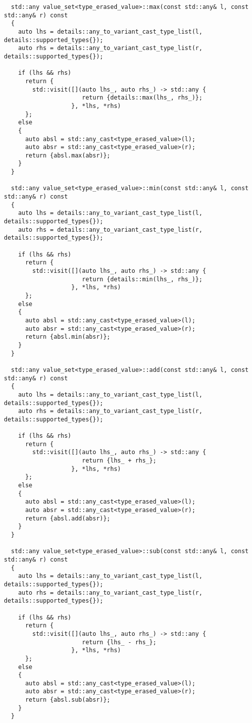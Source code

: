 \begin{verbatim}
  std::any value_set<type_erased_value>::max(const std::any& l, const std::any& r) const
  {
    auto lhs = details::any_to_variant_cast_type_list(l, details::supported_types{});
    auto rhs = details::any_to_variant_cast_type_list(r, details::supported_types{});

    if (lhs && rhs)
      return {
        std::visit([](auto lhs_, auto rhs_) -> std::any {
                      return {details::max(lhs_, rhs_)};
                   }, *lhs, *rhs)
      };
    else
    {
      auto absl = std::any_cast<type_erased_value>(l);
      auto absr = std::any_cast<type_erased_value>(r);
      return {absl.max(absr)};
    }
  }

  std::any value_set<type_erased_value>::min(const std::any& l, const std::any& r) const
  {
    auto lhs = details::any_to_variant_cast_type_list(l, details::supported_types{});
    auto rhs = details::any_to_variant_cast_type_list(r, details::supported_types{});

    if (lhs && rhs)
      return {
        std::visit([](auto lhs_, auto rhs_) -> std::any {
                      return {details::min(lhs_, rhs_)};
                   }, *lhs, *rhs)
      };
    else
    {
      auto absl = std::any_cast<type_erased_value>(l);
      auto absr = std::any_cast<type_erased_value>(r);
      return {absl.min(absr)};
    }
  }

  std::any value_set<type_erased_value>::add(const std::any& l, const std::any& r) const
  {
    auto lhs = details::any_to_variant_cast_type_list(l, details::supported_types{});
    auto rhs = details::any_to_variant_cast_type_list(r, details::supported_types{});

    if (lhs && rhs)
      return {
        std::visit([](auto lhs_, auto rhs_) -> std::any {
                      return {lhs_ + rhs_};
                   }, *lhs, *rhs)
      };
    else
    {
      auto absl = std::any_cast<type_erased_value>(l);
      auto absr = std::any_cast<type_erased_value>(r);
      return {absl.add(absr)};
    }
  }

  std::any value_set<type_erased_value>::sub(const std::any& l, const std::any& r) const
  {
    auto lhs = details::any_to_variant_cast_type_list(l, details::supported_types{});
    auto rhs = details::any_to_variant_cast_type_list(r, details::supported_types{});

    if (lhs && rhs)
      return {
        std::visit([](auto lhs_, auto rhs_) -> std::any {
                      return {lhs_ - rhs_};
                   }, *lhs, *rhs)
      };
    else
    {
      auto absl = std::any_cast<type_erased_value>(l);
      auto absr = std::any_cast<type_erased_value>(r);
      return {absl.sub(absr)};
    }
  }


\end{verbatim}
